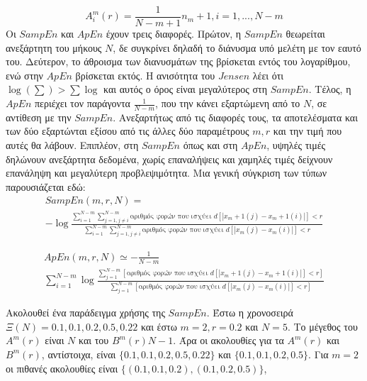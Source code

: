 \begin{equation}
	A_i ^m (r) = \frac{1}{N - m + 1} n_m+1 , i = 1, ..., N - m
\end{equation}
Οι $SampEn$ και $ApEn$ έχουν τρεις διαφορές. Πρώτον, η $SampEn$ θεωρείται ανεξάρτητη του
μήκους $Ν$, δε συγκρίνει δηλαδή το διάνυσμα υπό μελέτη με τον εαυτό του. Δεύτερον, το άθροισμα των διανυσμάτων της βρίσκεται εντός του λογαρίθμου, ενώ στην $ApEn$ βρίσκεται εκτός. Η ανισότητα του $Jensen$ λέει ότι $\log (\sum) > \sum \log$ και αυτός ο όρος είναι μεγαλύτερος στη $SampEn$. Τέλος, η $ApEn$ περιέχει τον παράγοντα $\frac{1}{N-m}$, που την κάνει εξαρτώμενη από το $Ν$, σε αντίθεση με την $SampEn$. Ανεξαρτήτως από τις διαφορές τους, τα αποτελέσματα και των δύο εξαρτώνται εξίσου από τις άλλες δύο παραμέτρους $m, r$ και την τιμή που αυτές θα λάβουν. Επιπλέον, στη $SampEn$ όπως και στη $ApEn$, υψηλές τιμές δηλώνουν ανεξάρτητα δεδομένα, χωρίς επαναλήψεις και χαμηλές τιμές δείχνουν επανάληψη και μεγαλύτερη προβλεψιμότητα. Μια γενική σύγκριση των
τύπων παρουσιάζεται εδώ:
\begin{equation}
	\begin{aligned}
		SampEn (m, r, N) = \\
		- \log \frac{\sum_{i=1}^{N-m} \sum_{j=1 , j\neq i}^{N-m} \text{αριθμός φορών που ισχύει } d[| x_m+1 (j) - x_m+1 (i) |] < r}{\sum_{i=1}^{N-m} \sum_{j=1 , j\neq i}^{N-m} \text{αριθμός φορών που ισχύει } d[| x_m (j) - x_m (i) |] < r}
	\end{aligned}
\end{equation}
\par
\begin{equation}
	\begin{aligned}
		ApEn (m, r, N) \simeq - \frac{1}{N-m} \\
		\sum_{i=1}^{N-m} \log \frac{\sum_{j=1}^{N-m} [\text{αριθμός φορών που ισχύει } d[| x_m+1 (j) - x_m+1 (i) |] < r]}{\sum_{j=1}^{N-m} [\text{αριθμός φορών που ισχύει } d[| x_m (j) - x_m (i) |] < r]}
	\end{aligned}
\end{equation}
\par
Ακολουθεί ένα παράδειγμα χρήσης της $SampEn$. Έστω η χρονοσειρά $Ξ(Ν) = {0.1, 0.1, 0.2, 0.5,
	0.22}$ και έστω $m = 2, r = 0.2$ και $ N = 5$. Το μέγεθος του $A^m(r)$ είναι $Ν$ και του $B^m(r) Ν-1$. Άρα οι ακολουθίες για τα $A^m(r)$ και $B^m(r)$, αντίστοιχα, είναι $ \{0.1, 0.1, 0.2, 0.5, 0.22\}$ και $\{0.1, 0.1, 0.2, 0.5\}$. Για $m = 2$ οι πιθανές ακολουθίες είναι $\{(0.1, 0.1, 0.2), (0.1, 0.2, 0.5)\}$, \\
